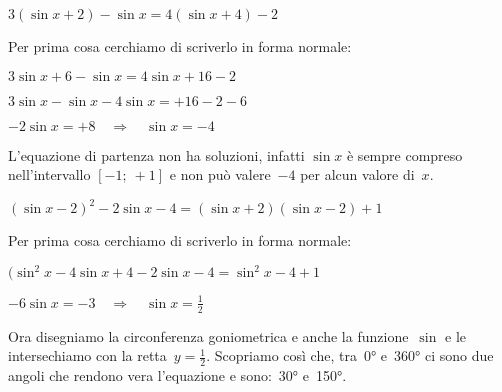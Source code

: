  \begin{esempio}
  $3(\sin x +2) - \sin x = 4 (\sin x +4)-2$
  
  Per prima cosa cerchiamo di scriverlo in forma normale:
  
  $3 \sin x +6 - \sin x = 4 \sin x +16-2$
  
  $3 \sin x - \sin x - 4 \sin x = +16-2-6 $
  
  $- 2 \sin x = +8 \quad \Rightarrow \quad \sin x = -4 $
  
  L'equazione di partenza non ha soluzioni, infatti $\sin x$ è sempre 
compreso 
  nell'intervallo $\left [-1;~+1 \right]$ e non può valere~$-4$ per alcun 
  valore di~$x$.
 \end{esempio}

 \begin{esempio}
  $(\sin x -2)^2 - 2 \sin x -4 = (\sin x +2)(\sin x -2)+1$
  
  Per prima cosa cerchiamo di scriverlo in forma normale:
  
  $(\sin^2 x -4 \sin x +4 - 2 \sin x -4 = \sin^2x -4 +1$
  
  $-6 \sin x = -3 \quad \Rightarrow \quad \sin x = \frac{1}{2}$
  
 \vspace{-6pt}
  \begin{center}
\begin{inaccessibleblock}[Soluzione grafica dell'equazione: 
    $\sin x = \frac{1}{2}$.]
    
\end{inaccessibleblock}
  \end{center}

  Ora disegniamo la circonferenza goniometrica e anche la funzione~$\sin$ 
  e le intersechiamo con la retta~$y=\frac{1}{2}$.
  Scopriamo così che, tra~0° e~360° ci sono due angoli che rendono vera 
  l'equazione e sono:~30° e~150°. 
 \end{esempio}

